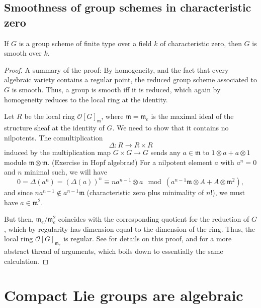 \subsection{Smoothness of group schemes in characteristic zero}
\label{subsection-smoothness-characteristiczero}

\begin{theorem}
\label{theorem-smoothness-characteristiczero}
If $G$ is a group scheme of finite type over a field $k$ of characteristic zero, then $G$ is smooth over $k$. 
\end{theorem}

\begin{proof}
A summary of the proof: By homogeneity, and the fact that every algebraic variety contains a regular point, the reduced group scheme associated to $G$ is smooth. Thus, a group is smooth iff it is reduced, which again by homogeneity reduces to the local ring at the identity. 

Let $R$ be the local ring $\mathcal O[G]_{\mathfrak m}$, where $\mathfrak m=\mathfrak m_e$ is the maximal ideal of the structure sheaf at the identity of $G$. We need to show that it contains no nilpotents. The comultiplication
$$ \Delta: R\to R\times R$$
induced by the multiplication map $G\times G\to G$ sends any $a\in \mathfrak m$ to $1\otimes a + a \otimes 1$ module $\mathfrak m \otimes \mathfrak m$. (Exercise in Hopf algebras!) For a nilpotent element $a$ with $a^n=0$ and $n$ minimal such, we will have 
$$ 0=\Delta(a^n)=(\Delta(a))^n \equiv na^{n-1} \otimes a \mod \left( a^{n-1}\mathfrak m \otimes A + A \otimes \mathfrak m^2 \right),$$
and since $na^{n-1} \notin a^{n-1} \mathfrak m$ (characteristic zero plus minimality of $n$!), we must have $a\in \mathfrak m^2$. 

But then, $\mathfrak m_e/\mathfrak m_e^2$ coincides with the corresponding quotient for the reduction of $G$, which by regularity has dimension equal to the dimension of the ring. Thus, the local ring $\mathcal O[G]_{\mathfrak m_e}$ is regular. See \cite[\S VI.9]{Milne-AGS} for details on this proof, and \cite[\href{https://stacks.math.columbia.edu/tag/047N}{Tag 047N}]{stacks-project} for a more abstract thread of arguments, which boils down to essentially the same calculation.
\end{proof}






\section{Compact Lie groups are algebraic}
\label{section-compact-algebraic}




